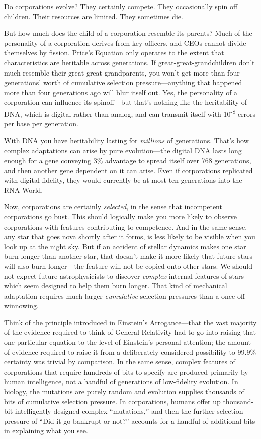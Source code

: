 {
 Do corporations evolve? They certainly compete. They occasionally
spin off children. Their resources are limited. They sometimes die.}

{
 But how much does the child of a corporation resemble its parents?
Much of the personality of a corporation derives from key officers, and
CEOs cannot divide themselves by fission. Price's
Equation only operates to the extent that characteristics are heritable
across generations. If great-great-grandchildren don't
much resemble their great-great-grandparents, you won't
get more than four generations' worth of cumulative
selection pressure---anything that happened more than four generations
ago will blur itself out. Yes, the personality of a corporation can
influence its spinoff---but that's nothing like the
heritability of DNA, which is digital rather than analog, and can
transmit itself with 10\textsuperscript{{}-8} errors per base per
generation.}

{
 With DNA you have heritability lasting for \textit{millions} of
generations. That's how complex adaptations can arise
by pure evolution---the digital DNA lasts long enough for a gene
conveying 3\% advantage to spread itself over 768 generations, and then
another gene dependent on it can arise. Even if corporations replicated
with digital fidelity, they would currently be at most ten generations
into the RNA World.}

{
 Now, corporations are certainly \textit{selected}, in the sense
that incompetent corporations go bust. This should logically make you
more likely to observe corporations with features contributing to
competence. And in the same sense, any star that goes nova shortly
after it forms, is less likely to be visible when you look up at the
night sky. But if an accident of stellar dynamics makes one star burn
longer than another star, that doesn't make it more
likely that future stars will also burn longer---the feature will not
be copied onto other stars. We should not expect future astrophysicists
to discover \textit{complex} internal features of stars which seem
designed to help them burn longer. That kind of mechanical adaptation
requires much larger \textit{cumulative} selection pressures than a
once-off winnowing.}

{
 Think of the principle introduced in Einstein's
Arrogance---that the vast majority of the evidence required to think of
General Relativity had to go into raising that one particular equation
to the level of Einstein's personal attention; the
amount of evidence required to raise it from a deliberately considered
possibility to 99.9\% certainty was trivial by comparison. In the same
sense, complex features of corporations that require hundreds of bits
to specify are produced primarily by human intelligence, not a handful
of generations of low-fidelity evolution. In biology, the mutations are
purely random and evolution supplies thousands of bits of cumulative
selection pressure. In corporations, humans offer up thousand-bit
intelligently designed complex
``mutations,'' and then the further
selection pressure of ``Did it go bankrupt or
not?'' accounts for a handful of additional bits in
explaining what you see.}

